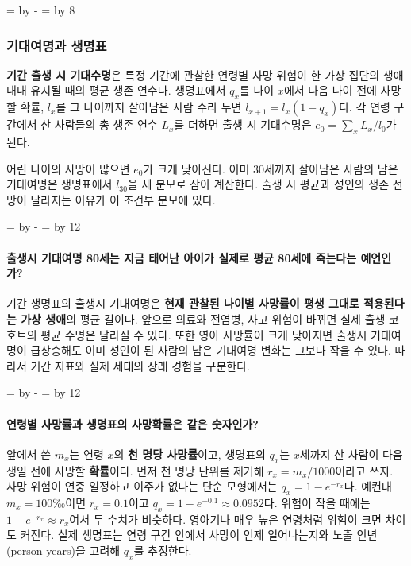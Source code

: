 \documentclass[10pt,a4paper]{article}
\newcommand{\ReserveQuestionSpace}{%
  \par\begingroup
  \dimen0=\pagegoal \advance\dimen0 by -\pagetotal
  \dimen2=\baselineskip \multiply\dimen2 by 12
  \ifdim\dimen0<\dimen2 \newpage\fi
  \endgroup}
\newcommand{\ReserveReadingSectionSpace}{%
  \par\begingroup
  \dimen0=\pagegoal \advance\dimen0 by -\pagetotal
  \dimen2=\baselineskip \multiply\dimen2 by 8
  \ifdim\dimen0<\dimen2 \newpage\fi
  \endgroup}
\begin{document}
\ReserveReadingSectionSpace
\subsubsection*{기대여명과 생명표}

\textbf{기간 출생 시 기대수명}은 특정 기간에 관찰한 연령별 사망 위험이 한 가상 집단의 생애 내내 유지될 때의 평균 생존 연수다. 생명표에서 $q_x$를 나이 $x$에서 다음 나이 전에 사망할 확률, $l_x$를 그 나이까지 살아남은 사람 수라 두면 $l_{x+1}=l_x(1-q_x)$다. 각 연령 구간에서 산 사람들의 총 생존 연수 $L_x$를 더하면 출생 시 기대수명은 $e_0=\sum_x L_x/l_0$가 된다.\par

어린 나이의 사망이 많으면 $e_0$가 크게 낮아진다. 이미 30세까지 살아남은 사람의 남은 기대여명은 생명표에서 $l_{30}$을 새 분모로 삼아 계산한다. 출생 시 평균과 성인의 생존 전망이 달라지는 이유가 이 조건부 분모에 있다.\par

\ReserveQuestionSpace
\paragraph{출생시 기대여명 80세는 지금 태어난 아이가 실제로 평균 80세에 죽는다는 예언인가?}
기간 생명표의 출생시 기대여명은 \textbf{현재 관찰된 나이별 사망률이 평생 그대로 적용된다는 가상 생애}의 평균 길이다. 앞으로 의료와 전염병, 사고 위험이 바뀌면 실제 출생 코호트의 평균 수명은 달라질 수 있다. 또한 영아 사망률이 크게 낮아지면 출생시 기대여명이 급상승해도 이미 성인이 된 사람의 남은 기대여명 변화는 그보다 작을 수 있다. 따라서 기간 지표와 실제 세대의 장래 경험을 구분한다.\par

\ReserveQuestionSpace
\paragraph{연령별 사망률과 생명표의 사망확률은 같은 숫자인가?}
앞에서 쓴 $m_x$는 연령 $x$의 \textbf{천 명당 사망률}이고, 생명표의 $q_x$는 $x$세까지 산 사람이 다음 생일 전에 사망할 \textbf{확률}이다. 먼저 천 명당 단위를 제거해 $r_x=m_x/1000$이라고 쓰자. 사망 위험이 연중 일정하고 이주가 없다는 단순 모형에서는 $q_x=1-e^{-r_x}$다. 예컨대 $m_x=100$‰이면 $r_x=0.1$이고 $q_x=1-e^{-0.1}\approx0.0952$다. 위험이 작을 때에는 $1-e^{-r_x}\approx r_x$여서 두 수치가 비슷하다. 영아기나 매우 높은 연령처럼 위험이 크면 차이도 커진다. 실제 생명표는 연령 구간 안에서 사망이 언제 일어나는지와 노출 인년(person-years)을 고려해 $q_x$를 추정한다.\par
\end{document}
